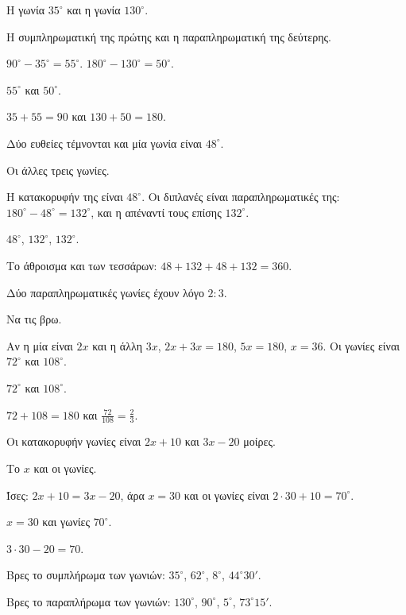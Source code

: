 
\tixero Η γωνία $35^\circ$ και η γωνία $130^\circ$.\par
\tithelo Η συμπληρωματική της πρώτης και η παραπληρωματική της δεύτερης.\par
\possindeo $90^\circ-35^\circ=55^\circ$. $180^\circ-130^\circ=50^\circ$.\par
\apantisi $55^\circ$ και $50^\circ$.\par
\elegxos $35+55=90$ και $130+50=180$.

\tixero Δύο ευθείες τέμνονται και μία γωνία είναι $48^\circ$.\par
\tithelo Οι άλλες τρεις γωνίες.\par
\possindeo Η κατακορυφήν της είναι $48^\circ$. Οι διπλανές είναι παραπληρωματικές της: $180^\circ-48^\circ=132^\circ$, και η απέναντί τους επίσης $132^\circ$.\par
\apantisi $48^\circ$, $132^\circ$, $132^\circ$.\par
\elegxos Το άθροισμα και των τεσσάρων: $48+132+48+132=360$.

\tixero Δύο παραπληρωματικές γωνίες έχουν λόγο $2:3$.\par
\tithelo Να τις βρω.\par
\possindeo Αν η μία είναι $2x$ και η άλλη $3x$, $2x+3x=180$, $5x=180$, $x=36$. Οι γωνίες είναι $72^\circ$ και $108^\circ$.\par
\apantisi $72^\circ$ και $108^\circ$.\par
\elegxos $72+108=180$ και $\frac{72}{108}=\frac{2}{3}$.

\tixero Οι κατακορυφήν γωνίες είναι $2x+10$ και $3x-20$ μοίρες.\par
\tithelo Το $x$ και οι γωνίες.\par
\possindeo Ίσες: $2x+10=3x-20$, άρα $x=30$ και οι γωνίες είναι $2\cdot30+10=70^\circ$.\par
\apantisi $x=30$ και γωνίες $70^\circ$.\par
\elegxos $3\cdot30-20=70$.



\ex Βρες το συμπλήρωμα των γωνιών: $35^\circ$, $62^\circ$, $8^\circ$, $44^\circ30'$.

\ex Βρες το παραπλήρωμα των γωνιών: $130^\circ$, $90^\circ$, $5^\circ$, $73^\circ15'$.

